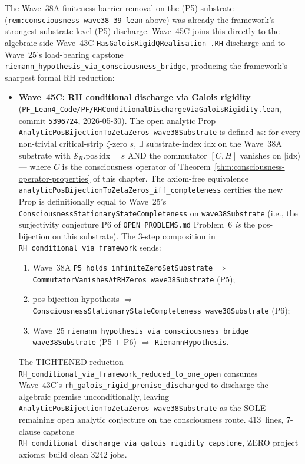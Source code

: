 \begin{remark}\label{rem:consciousness-wave45c-lean}
The Wave~38A finiteness-barrier removal on the (P5) substrate (\texttt{rem:consciousness-wave38-39-lean} above) was already the framework's strongest substrate-level (P5) discharge. Wave~45C joins this directly to the algebraic-side Wave~43C \texttt{HasGaloisRigidQRealisation .RH} discharge and to Wave~25's load-bearing capstone \texttt{riemann\_hypothesis\_via\_consciousness\_bridge}, producing the framework's sharpest formal RH reduction:
\begin{itemize}
  \item \textbf{Wave~45C: RH conditional discharge via Galois rigidity} (\texttt{PF\_Lean4\_Code/PF/RHConditionalDischargeViaGaloisRigidity.lean}, commit \texttt{5396724}, 2026-05-30). The open analytic Prop \texttt{AnalyticPosBijectionToZetaZeros wave38Substrate} is defined as: for every non-trivial critical-strip $\zeta$-zero $s$, $\exists$ substrate-index $\mathrm{idx}$ on the Wave~38A substrate with $\mathcal{S}_R.\mathrm{pos}\,\mathrm{idx} = s$ AND the commutator $[C, H]$ vanishes on $|\mathrm{idx}\rangle$ --- where $C$ is the consciousness operator of Theorem~\ref{thm:consciousness-operator-properties} of this chapter. The axiom-free equivalence \texttt{analyticPosBijectionToZetaZeros\_iff\_completeness} certifies the new Prop is definitionally equal to Wave~25's \texttt{ConsciousnessStationaryStateCompleteness} on \texttt{wave38Substrate} (i.e., the surjectivity conjecture P6 of \texttt{OPEN\_PROBLEMS.md} Problem~6 \emph{is} the pos-bijection on this substrate). The 3-step composition in \texttt{RH\_conditional\_via\_framework} sends:
  \begin{enumerate}
    \item Wave~38A \texttt{P5\_holds\_infiniteZeroSetSubstrate} $\Rightarrow$ \texttt{CommutatorVanishesAtRHZeros wave38Substrate} (P5);
    \item pos-bijection hypothesis $\Rightarrow$ \texttt{ConsciousnessStationaryStateCompleteness wave38Substrate} (P6);
    \item Wave~25 \texttt{riemann\_hypothesis\_via\_consciousness\_bridge wave38Substrate} (P5 $+$ P6) $\Rightarrow$ \texttt{RiemannHypothesis}.
  \end{enumerate}
  The TIGHTENED reduction \texttt{RH\_conditional\_via\_framework\_reduced\_to\_one\_open} consumes Wave~43C's \texttt{rh\_galois\_rigid\_premise\_discharged} to discharge the algebraic premise unconditionally, leaving \texttt{AnalyticPosBijectionToZetaZeros wave38Substrate} as the SOLE remaining open analytic conjecture on the consciousness route. 413~lines, 7-clause capstone \texttt{RH\_conditional\_discharge\_via\_galois\_rigidity\_capstone}, ZERO project axioms; build clean 3242 jobs.

\end{itemize}
\end{remark}
